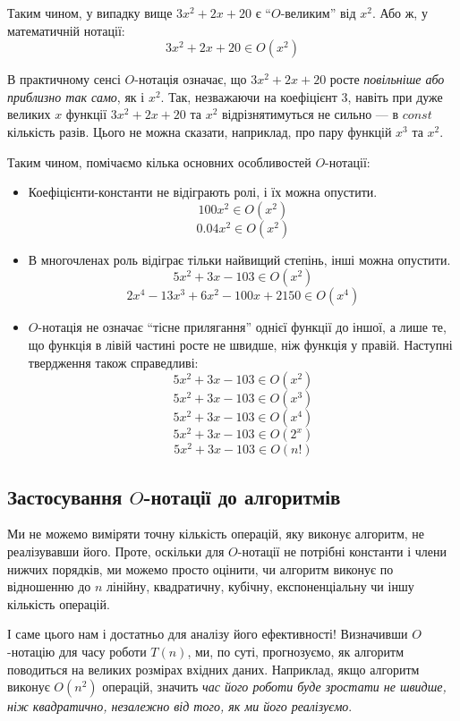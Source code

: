 \documentclass[12pt,a4paper]{report}
\begin{document}
Таким чином, у випадку вище \(3x^2 + 2x + 20\) є ``\(O\)-великим'' від \(x^2\).
Або ж, у математичній нотації:
\[3x^2 + 2x + 20 \in O(x^2)\]

В практичному сенсі \(O\)-нотація означає, що \(3x^2 + 2x + 20\) росте \emph{повільніше або приблизно так само}, як і \(x^2\).
Так, незважаючи на коефіцієнт \(3\), навіть при дуже великих \(x\) функції \(3x^2 + 2x + 20\) та \(x^2\) відрізнятимуться не сильно --- в \(const\) кількість разів. Цього не можна сказати, наприклад, про пару функцій \(x^3\) та \(x^2\).

Таким чином, помічаємо кілька основних особливостей \(O\)-нотації:
\begin{itemize}
    \item Коефіцієнти-константи не відіграють ролі, і їх можна опустити.
        \[100x^2 \in O(x^2)\]
        \[0.04x^2 \in O(x^2)\]
    \item В многочленах роль відіграє тільки найвищий степінь, інші можна опустити.
        \[5x^2 + 3x - 103 \in O(x^2)\]
        \[2x^4 - 13x^3 + 6x^2 - 100x + 2150 \in O(x^4)\]
    \item \(O\)-нотація не означає ``тісне прилягання'' однієї функції до іншої, а лише те, що функція в лівій частині росте не швидше, ніж функція у правій. Наступні твердження також справедливі:
        \[5x^2 + 3x - 103 \in O(x^2)\]
        \[5x^2 + 3x - 103 \in O(x^3)\]
        \[5x^2 + 3x - 103 \in O(x^4)\]
        \[5x^2 + 3x - 103 \in O(2^x)\]
        \[5x^2 + 3x - 103 \in O(n!)\]

\end{itemize}


\subsection*{Застосування \(O\)-нотації до алгоритмів}

Ми не можемо виміряти точну кількість операцій, яку виконує алгоритм, не реалізувавши його.
Проте, оскільки для \(O\)-нотації не потрібні константи і члени нижчих порядків, ми можемо просто оцінити, чи алгоритм виконує по відношенню до \(n\) лінійну, квадратичну, кубічну, експоненціальну чи іншу кількість операцій.

І саме цього нам і достатньо для аналізу його ефективності!
Визначивши \(O\)-нотацію для часу роботи \(T(n)\), ми, по суті, прогнозуємо, як алгоритм поводиться на великих розмірах вхідних даних.
Наприклад, якщо алгоритм виконує \(O(n^2)\) операцій, значить \emph{час його роботи буде зростати не швидше, ніж квадратично, незалежно від того, як ми його реалізуємо}.
\end{document}
